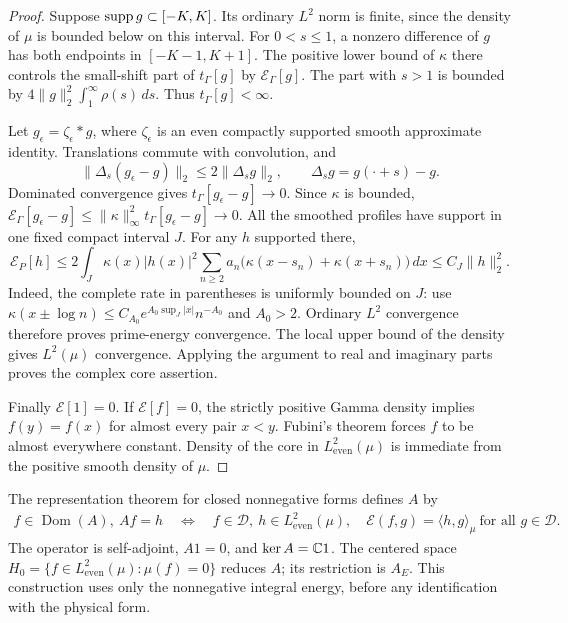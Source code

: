 \documentclass[11pt,a4paper]{article}
\numberwithin{equation}{section}
\theoremstyle{definition}\newtheorem{definition}[theorem]{Definition}
\theoremstyle{remark}\newtheorem{remark}[theorem]{Remark}
\newcommand{\E}{\mathcal E}\newcommand{\D}{\mathcal D}
\newcommand{\He}{L^2_{\mathrm{even}}(\mu)}\newcommand{\Le}{L^2_{\mathrm{even}}(dx)}
\newcommand{\tg}{t_\Gamma}\newcommand{\cg}{c_\Gamma}
\newcommand{\dom}{\operatorname{Dom}}\newcommand{\Var}{\operatorname{Var}}
\newcommand{\ip}[2]{\langle#1,#2\rangle}\newcommand{\norm}[1]{\lVert#1\rVert}\newcommand{\abs}[1]{\lvert#1\rvert}
\begin{document}
\begin{proof}
Suppose $\operatorname{supp} g\subset[-K,K]$. Its ordinary $L^2$ norm is finite, since the density of $\mu$ is bounded below on this interval. For $0<s\le1$, a nonzero difference of $g$ has both endpoints in $[-K-1,K+1]$. The positive lower bound of $\kappa$ there controls the small-shift part of $\tg[g]$ by $\E_\Gamma[g]$. The part with $s>1$ is bounded by $4\norm{g}_2^2\int_1^\infty\rho(s)\,ds$. Thus $\tg[g]<\infty$.

Let $g_\epsilon=\zeta_\epsilon*g$, where $\zeta_\epsilon$ is an even compactly supported smooth approximate identity. Translations commute with convolution, and
\[
 \norm{\Delta_s(g_\epsilon-g)}_2\le2\norm{\Delta_sg}_2,
 \qquad\Delta_sg=g(\cdot+s)-g.
\]
Dominated convergence gives $\tg[g_\epsilon-g]\to0$. Since $\kappa$ is bounded,
$\E_\Gamma[g_\epsilon-g]\le\norm{\kappa}_\infty^2\tg[g_\epsilon-g]\to0$.
All the smoothed profiles have support in one fixed compact interval $J$. For any $h$ supported there,
\begin{equation}\label{a:eq:compactprimerate}
 \E_P[h]\le2\int_J\kappa(x)|h(x)|^2
     \sum_{n\ge2}a_n\bigl(\kappa(x-s_n)+\kappa(x+s_n)\bigr)\,dx
 \le C_J\norm{h}_2^2.
\end{equation}
Indeed, the complete rate in parentheses is uniformly bounded on $J$: use $\kappa(x\pm\log n)\le C_{A_0}e^{A_0\sup_J|x|}n^{-A_0}$ and $A_0>2$. Ordinary $L^2$ convergence therefore proves prime-energy convergence. The local upper bound of the density gives $L^2(\mu)$ convergence. Applying the argument to real and imaginary parts proves the complex core assertion.

Finally $\E[1]=0$. If $\E[f]=0$, the strictly positive Gamma density implies $f(y)=f(x)$ for almost every pair $x<y$. Fubini's theorem forces $f$ to be almost everywhere constant. Density of the core in $\He$ is immediate from the positive smooth density of $\mu$.
\end{proof}

The representation theorem for closed nonnegative forms \cite[Chapter~VI, Section~2]{Kato} defines $A$ by
\begin{equation}\label{a:eq:Adef}
 \begin{split}
 f\in\dom(A),\ Af=h\quad\Longleftrightarrow\quad
 f\in\D,\ h\in\He,\quad
 \E(f,g)=\ip{h}{g}_\mu\ \text{for all }g\in\D.
 \end{split}
\end{equation}
The operator is self-adjoint, $A1=0$, and $\ker A=\mathbb C1$. The centered space
$H_0=\{f\in\He:\mu(f)=0\}$ reduces $A$; its restriction is $A_E$. This construction uses only the nonnegative integral energy, before any identification with the physical form.
\end{document}
